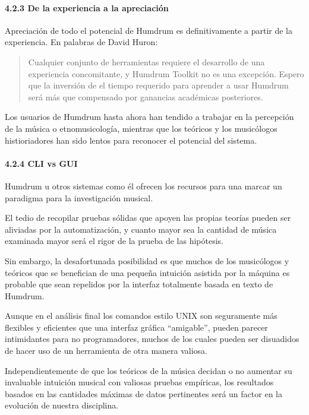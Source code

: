 \documentclass[]{article}
\let\oldparagraph\paragraph
\renewcommand{\paragraph}[1]{\oldparagraph{#1}\mbox{}}
\begin{document}
\hypertarget{de-la-experiencia-a-la-apreciaciuxf3n}{%
\paragraph{4.2.3 De la experiencia a la
apreciación}\label{de-la-experiencia-a-la-apreciaciuxf3n}}

Apreciación de todo el potencial de Humdrum es definitivamente a partir
de la experiencia. En palabras de David Huron:

\begin{quote}
Cualquier conjunto de herramientas requiere el desarrollo de una
experiencia concomitante, y Humdrum Toolkit no es una excepción. Espero
que la inversión de el tiempo requerido para aprender a usar Humdrum
será más que compensado por ganancias académicas posteriores.
\end{quote}

Los usuarios de Humdrum hasta ahora han tendido a trabajar en la
percepción de la música o etnomusicología, mientras que los teóricos y
los musicólogos histioriadores han sido lentos para reconocer el
potencial del sistema.

\hypertarget{cli-vs-gui}{%
\paragraph{4.2.4 CLI vs GUI}\label{cli-vs-gui}}

Humdrum u otros sistemas como él ofrecen los recursos para una marcar un
paradigma para la investigación musical.

El tedio de recopilar pruebas sólidas que apoyen las propias teorías
pueden ser aliviadas por la automatización, y cuanto mayor sea la
cantidad de música examinada mayor será el rigor de la prueba de las
hipótesis.

Sin embargo, la desafortunada posibilidad es que muchos de los
musicólogos y teóricos que se benefician de una pequeña intuición
asistida por la máquina es probable que sean repelidos por la interfaz
totalmente basada en texto de Humdrum.

Aunque en el análisis final los comandos estilo UNIX son seguramente más
flexibles y eficientes que una interfaz gráfica ``amigable'', pueden
parecer intimidantes para no programadores, muchos de los cuales pueden
ser disuadidos de hacer uso de un herramienta de otra manera valiosa.

Independientemente de que los teóricos de la música decidan o no
aumentar su invaluable intuición musical con valiosas pruebas empíricas,
los resultados basados en las cantidades máximas de datos pertinentes
será un factor en la evolución de nuestra disciplina.
\end{document}
